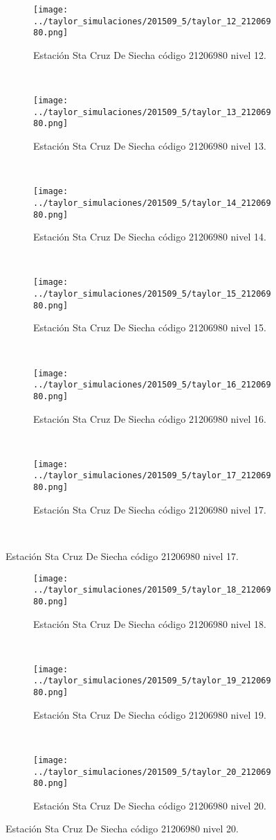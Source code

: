 \begin{figure}[H]\ContinuedFloat
\centering
\begin{subfigure}[normla]{0.4\textwidth}
\texttt{[image: ../taylor\_simulaciones/201509\_5/taylor\_12\_21206980.png]}
\caption{Estación Sta Cruz De Siecha  código 21206980 nivel 12.}
\end{subfigure}
~
\begin{subfigure}[normla]{0.4\textwidth}
\texttt{[image: ../taylor\_simulaciones/201509\_5/taylor\_13\_21206980.png]}
\caption{Estación Sta Cruz De Siecha  código 21206980 nivel 13.}
\end{subfigure}
~
\begin{subfigure}[normla]{0.4\textwidth}
\texttt{[image: ../taylor\_simulaciones/201509\_5/taylor\_14\_21206980.png]}
\caption{Estación Sta Cruz De Siecha  código 21206980 nivel 14.}
\end{subfigure}
~
\begin{subfigure}[normla]{0.4\textwidth}
\texttt{[image: ../taylor\_simulaciones/201509\_5/taylor\_15\_21206980.png]}
\caption{Estación Sta Cruz De Siecha  código 21206980 nivel 15.}
\end{subfigure}
~
\begin{subfigure}[normla]{0.4\textwidth}
\texttt{[image: ../taylor\_simulaciones/201509\_5/taylor\_16\_21206980.png]}
\caption{Estación Sta Cruz De Siecha  código 21206980 nivel 16.}
\end{subfigure}
~
\begin{subfigure}[normla]{0.4\textwidth}
\texttt{[image: ../taylor\_simulaciones/201509\_5/taylor\_17\_21206980.png]}
\caption{Estación Sta Cruz De Siecha  código 21206980 nivel 17.}
\end{subfigure}
~
\end{figure}
           
\begin{figure}[H]\ContinuedFloat
\centering
\begin{subfigure}[normla]{0.4\textwidth}
\texttt{[image: ../taylor\_simulaciones/201509\_5/taylor\_18\_21206980.png]}
\caption{Estación Sta Cruz De Siecha  código 21206980 nivel 18.}
\end{subfigure}
~
\begin{subfigure}[normla]{0.4\textwidth}
\texttt{[image: ../taylor\_simulaciones/201509\_5/taylor\_19\_21206980.png]}
\caption{Estación Sta Cruz De Siecha  código 21206980 nivel 19.}
\end{subfigure}
~
\begin{subfigure}[normla]{0.4\textwidth}
\texttt{[image: ../taylor\_simulaciones/201509\_5/taylor\_20\_21206980.png]}
\caption{Estación Sta Cruz De Siecha  código 21206980 nivel 20.}
\end{subfigure}


\end{figure}